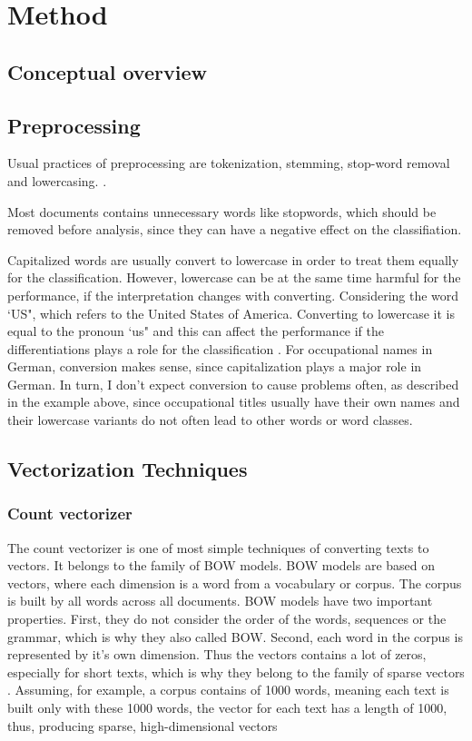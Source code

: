 \documentclass[12pt, a4paper, titlepage]{article}
\begin{document}
\section{Method}
\subsection{Conceptual overview}
\subsection{Preprocessing}

Usual practices of preprocessing are tokenization, stemming, stop-word removal and lowercasing. \citep{alsmadi2019}. 

Most documents contains unnecessary words like stopwords, which should be removed before analysis, since they can have a negative effect on the classifiation.

Capitalized words are usually convert to lowercase in order to treat them equally for the classification. However, lowercase can be at the same time harmful for the performance, if the interpretation changes with converting. Considering the word `US", which refers to the United States of America. Converting to lowercase it is equal to the pronoun `us" and this can affect the performance if the differentiations plays a role for the classification \citep{kowsari2019text}. For occupational names in German, conversion makes sense, since capitalization plays a major role in German. In turn, I don't expect conversion to cause problems often, as described in the example above, since occupational titles usually have their own names and their lowercase variants do not often lead to other words or word classes. 

\subsection{Vectorization Techniques}
\subsubsection{Count vectorizer}
The count vectorizer is one of most simple techniques of converting texts to vectors. It belongs to the family of \ac{BOW} models. \ac{BOW} models are based on vectors, where each dimension is a word from a vocabulary or corpus. The corpus is built by all words across all documents. \ac{BOW} models have two important properties. First, they do not consider the order of the words, sequences or the grammar, which is why they also called \ac{BOW}. Second, each word in the corpus is represented by it's own dimension. Thus the vectors contains a lot of zeros, especially for short texts, which is why they belong to the family of sparse vectors \citep{ajose2020}.  Assuming, for example, a corpus contains of 1000 words, meaning each text is built only with these 1000 words, the vector for each text has a length of 1000, thus, producing sparse, high-dimensional vectors \citep{kulkarni2021, sarkar2016}
\end{document}
